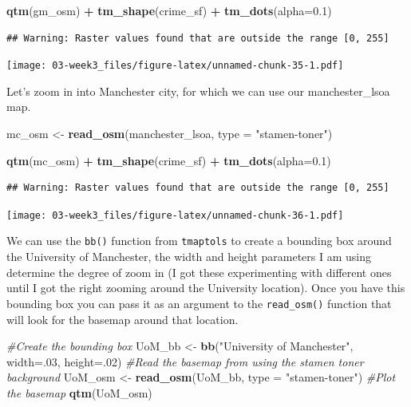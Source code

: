 \documentclass[]{book}
\newenvironment{Shaded}{\begin{snugshade}}{\end{snugshade}}
\newcommand{\CommentTok}[1]{\textcolor[rgb]{0.56,0.35,0.01}{\textit{#1}}}
\newcommand{\DataTypeTok}[1]{\textcolor[rgb]{0.13,0.29,0.53}{#1}}
\newcommand{\DecValTok}[1]{\textcolor[rgb]{0.00,0.00,0.81}{#1}}
\newcommand{\FloatTok}[1]{\textcolor[rgb]{0.00,0.00,0.81}{#1}}
\newcommand{\KeywordTok}[1]{\textcolor[rgb]{0.13,0.29,0.53}{\textbf{#1}}}
\newcommand{\NormalTok}[1]{#1}
\newcommand{\OperatorTok}[1]{\textcolor[rgb]{0.81,0.36,0.00}{\textbf{#1}}}
\newcommand{\StringTok}[1]{\textcolor[rgb]{0.31,0.60,0.02}{#1}}
\begin{document}
\begin{Shaded}
\begin{Highlighting}[]
\KeywordTok{qtm}\NormalTok{(gm_osm) }\OperatorTok{+}\StringTok{ }
\StringTok{  }\KeywordTok{tm_shape}\NormalTok{(crime_sf) }\OperatorTok{+}\StringTok{ }
\StringTok{  }\KeywordTok{tm_dots}\NormalTok{(}\DataTypeTok{alpha=}\FloatTok{0.1}\NormalTok{) }
\end{Highlighting}
\end{Shaded}

\begin{verbatim}
## Warning: Raster values found that are outside the range [0, 255]
\end{verbatim}

\texttt{[image: 03-week3\_files/figure-latex/unnamed-chunk-35-1.pdf]}

Let's zoom in into Manchester city, for which we can use our manchester\_lsoa map.

\begin{Shaded}
\begin{Highlighting}[]
\NormalTok{mc_osm <-}\StringTok{ }\KeywordTok{read_osm}\NormalTok{(manchester_lsoa, }\DataTypeTok{type =} \StringTok{"stamen-toner"}\NormalTok{)}

\KeywordTok{qtm}\NormalTok{(mc_osm) }\OperatorTok{+}\StringTok{ }
\StringTok{  }\KeywordTok{tm_shape}\NormalTok{(crime_sf) }\OperatorTok{+}\StringTok{ }
\StringTok{  }\KeywordTok{tm_dots}\NormalTok{(}\DataTypeTok{alpha=}\FloatTok{0.1}\NormalTok{) }
\end{Highlighting}
\end{Shaded}

\begin{verbatim}
## Warning: Raster values found that are outside the range [0, 255]
\end{verbatim}

\texttt{[image: 03-week3\_files/figure-latex/unnamed-chunk-36-1.pdf]}

We can use the \texttt{bb()} function from \texttt{tmaptols} to create a bounding box around the University of Manchester, the width and height parameters I am using determine the degree of zoom in (I got these experimenting with different ones until I got the right zooming around the University location). Once you have this bounding box you can pass it as an argument to the \texttt{read\_osm()} function that will look for the basemap around that location.

\begin{Shaded}
\begin{Highlighting}[]
\CommentTok{#Create the bounding box}
\NormalTok{UoM_bb <-}\StringTok{ }\KeywordTok{bb}\NormalTok{(}\StringTok{"University of Manchester"}\NormalTok{, }\DataTypeTok{width=}\NormalTok{.}\DecValTok{03}\NormalTok{, }\DataTypeTok{height=}\NormalTok{.}\DecValTok{02}\NormalTok{)}
\CommentTok{#Read the basemap from using the stamen toner background}
\NormalTok{UoM_osm <-}\StringTok{ }\KeywordTok{read_osm}\NormalTok{(UoM_bb, }\DataTypeTok{type =} \StringTok{"stamen-toner"}\NormalTok{)}
\CommentTok{#Plot the basemap}
\KeywordTok{qtm}\NormalTok{(UoM_osm)}
\end{Highlighting}
\end{Shaded}
\end{document}
